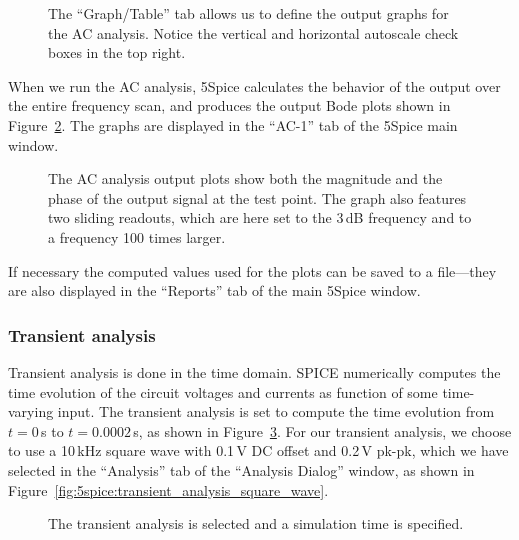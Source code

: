 \documentclass{article}
\begin{document}
\begin{figure}
\begin{center}
\end{center}
\caption{The ``Graph/Table'' tab allows us to define the output graphs for the AC analysis.  Notice the vertical and horizontal autoscale check boxes in the top right.}
\label{fig:5spice:AC_analysis_output_graphs}
\end{figure}

When we run the AC analysis, 5Spice calculates the behavior of the output over the entire frequency scan, and produces the output Bode plots shown in Figure~\ref{fig:5spice:AC_analysis_results}. The graphs are displayed in the ``AC-1'' tab of the 5Spice main window.

\begin{figure}
\begin{center}
\end{center}
\caption{The AC analysis output plots show both the magnitude and the phase of the output signal at the test point. The graph also features two sliding readouts, which are here set to the 3\,dB frequency and to a frequency 100 times larger.}
\label{fig:5spice:AC_analysis_results}
\end{figure}

If necessary the computed values used for the plots can be saved to a file---they are also displayed in the ``Reports'' tab of the main 5Spice window.

\subsubsection{Transient analysis}
Transient analysis is done in the time domain. SPICE numerically computes the time evolution of the circuit voltages and currents as function of some time-varying input. The transient analysis is set to compute the time evolution from $t = 0$\,s to $t = 0.0002$\,s, as shown in Figure~\ref{fig:5spice:transient_analysis}.  For our transient analysis, we choose to use a 10\,kHz square wave with 0.1\,V DC offset and 0.2\,V pk-pk, which we have selected in the ``Analysis'' tab of the ``Analysis Dialog'' window, as shown in Figure~\ref{fig:5spice:transient_analysis_square_wave}. 

\begin{figure}
\begin{center}
\end{center}
\caption{The transient analysis is selected and a simulation time is specified.}
\label{fig:5spice:transient_analysis}
\end{figure}
\end{document}
